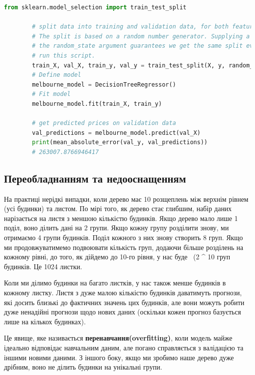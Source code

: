 \documentclass[11pt]{article}
\begin{document}
    \begin{lstlisting}[style=light, language=Python,label={lst:vectorimg},caption=The mean absolute error calculcation]
        from sklearn.model_selection import train_test_split

        # split data into training and validation data, for both features and target
        # The split is based on a random number generator. Supplying a numeric value to
        # the random_state argument guarantees we get the same split every time we
        # run this script.
        train_X, val_X, train_y, val_y = train_test_split(X, y, random_state = 0)
        # Define model
        melbourne_model = DecisionTreeRegressor()
        # Fit model
        melbourne_model.fit(train_X, train_y)

        # get predicted prices on validation data
        val_predictions = melbourne_model.predict(val_X)
        print(mean_absolute_error(val_y, val_predictions))
        # 263007.8766946417
    \end{lstlisting}

    \subsection{Переобладнанням та недооснащенням}\label{subsec:underfitting_overfitting}
    На практиці нерідкі випадки, коли дерево має 10 розщеплень між верхнім рівнем (усі будинки) та листом.
    По мірі того, як дерево стає глибшим, набір даних нарізається на листя з меншою кількістю будинків.
    Якщо дерево мало лише 1 поділ, воно ділить дані на 2 групи.
    Якщо кожну групу розділити знову, ми отримаємо 4 групи будинків.
    Поділ кожного з них знову створить 8 груп.
    Якщо ми продовжуватимемо подвоювати кількість груп, додаючи більше розділень на кожному рівні, до того, як дійдемо до 10-го рівня, у нас буде \ (2 ^ 10 \) груп будинків.
    Це 1024 листки.

    Коли ми ділимо будинки на багато листків, у нас також менше будинків в кожному листку.
    Листя з дуже малою кількістю будинків даватимуть прогнози, які досить близькі до фактичних значень цих будинків, але вони можуть робити дуже ненадійні прогнози щодо нових даних (оскільки кожен прогноз базується лише на кількох будинках).

    Це явище, яке називається \textbf{перенавчання(overfitting)}, коли модель майже ідеально відповідає навчальним даним, але погано справляється з валідацією та іншими новими даними.
    З іншого боку, якщо ми зробимо наше дерево дуже дрібним, воно не ділить будинки на унікальні групи.
\end{document}
